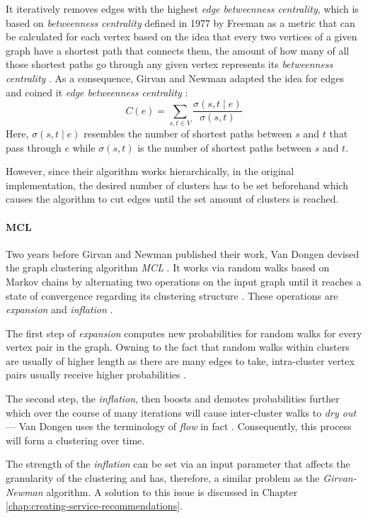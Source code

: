 \documentclass[12pt,a4paper]{report}
\begin{document}
It iteratively removes edges with the highest \textit{edge betweenness
centrality}, which is based on \textit{betweenness centrality} defined in 1977
by Freeman as a metric that can be calculated for each vertex based on the idea
that every two vertices of a given graph have a shortest path that connects
them, the amount of how many of all those shortest paths go through any given
vertex represents its \textit{betweenness centrality} \cite{freeman1977set}. As
a consequence, Girvan and Newman adapted the idea for edges and coined it
\textit{edge betweenness centrality} \cite{girvan2002community}:
\[
  C(e) = \sum_{s, t \in V} \frac{\sigma(s, t \mid e)}{\sigma(s, t)}
\]
Here, \(\sigma(s, t \mid e)\) resembles the number of shortest paths between
\(s\) and \(t\) that pass through \(e\) while \(\sigma(s, t)\) is the
number of shortest paths between \(s\) and \(t\).

However, since their algorithm works hierarchically, in the original
implementation, the desired number of clusters has to be set beforehand which
causes the algorithm to cut edges until the set amount of clusters is reached.

\paragraph{MCL \cite{vandongen2000graph}}
Two years before Girvan and Newman
published their work, Van Dongen devised the graph clustering algorithm
\textit{MCL} \cite{vandongen2000graph}. It works via random walks based on Markov
chains by alternating two operations on the input graph until it reaches a
state of convergence regarding its clustering structure \cite{
vandongen2000graph}. These operations are \textit{expansion} and
\textit{inflation} \cite{vandongen2000graph}.

The first step of \textit{expansion} computes new probabilities for random
walks for every vertex pair in the graph. Owning to the fact that random walks
within clusters are usually of higher length as there are many edges to take,
intra-cluster vertex pairs usually receive higher probabilities
\cite{vandongen2000graph}.

The second step, the \textit{inflation}, then boosts and demotes probabilities
further which over the course of many iterations will cause inter-cluster walks
to \textit{dry out} --- Van Dongen uses the terminology of \textit{flow} in
fact \cite{vandongen2000graph}. Consequently, this process will form a
clustering over time.

The strength of the \textit{inflation} can be set via an input parameter that
affects the granularity of the clustering and has, therefore, a similar problem
as the \textit{Girvan-Newman} algorithm. A solution to this issue is discussed
in Chapter \ref{chap:creating-service-recommendations}.
\end{document}
